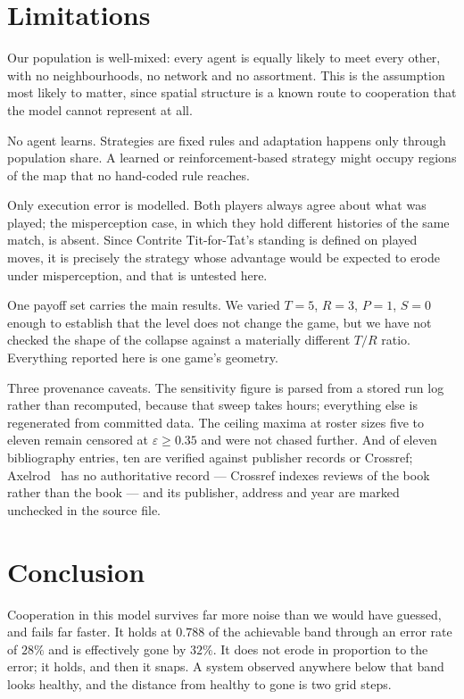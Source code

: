 \documentclass[11pt,a4paper]{article}
\newcommand{\eps}{\varepsilon}
\begin{document}
\section{Limitations}
\label{sec:limitations}

Our population is well-mixed: every agent is equally likely to meet every other,
with no neighbourhoods, no network and no assortment. This is the assumption most
likely to matter, since spatial structure is a known route to cooperation that
the model cannot represent at all.

No agent learns. Strategies are fixed rules and adaptation happens only through
population share. A learned or reinforcement-based strategy might occupy regions
of the map that no hand-coded rule reaches.

Only execution error is modelled. Both players always agree about what was
played; the misperception case, in which they hold different histories of the
same match, is absent. Since Contrite Tit-for-Tat's standing is defined on played
moves, it is precisely the strategy whose advantage would be expected to erode
under misperception, and that is untested here.

One payoff set carries the main results. We varied $T=5$, $R=3$, $P=1$, $S=0$
enough to establish that the level does not change the game, but we have not
checked the shape of the collapse against a materially different $T/R$ ratio.
Everything reported here is one game's geometry.

Three provenance caveats. The sensitivity figure is parsed from a stored run log
rather than recomputed, because that sweep takes hours; everything else is
regenerated from committed data. The ceiling maxima at roster sizes five to
eleven remain censored at $\eps \geq 0.35$ and were not chased further. And of
eleven bibliography entries, ten are verified against publisher records or
Crossref; Axelrod~\cite{axelrod1984} has no authoritative record --- Crossref
indexes reviews of the book rather than the book --- and its publisher, address
and year are marked unchecked in the source file.

\section{Conclusion}
\label{sec:conclusion}

Cooperation in this model survives far more noise than we would have guessed,
and fails far faster. It holds at $\mathbf{0.788}$ of the achievable band through
an error rate of $28\%$ and is effectively gone by $32\%$. It does not erode in
proportion to the error; it holds, and then it snaps. A system observed anywhere
below that band looks healthy, and the distance from healthy to gone is two grid
steps.
\end{document}
